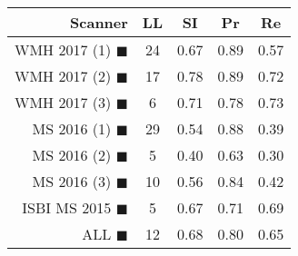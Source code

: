\begin{tabular}{rcccc}
\toprule
Scanner & LL & SI & Pr & Re \\
\midrule
WMH 2017 (1) {\color[rgb]{ 1.00 0.00 0.00}$\blacksquare$} & 24 & 0.67 & 0.89 & 0.57 \\
WMH 2017 (2) {\color[rgb]{ 1.00 0.50 0.00}$\blacksquare$} & 17 & 0.78 & 0.89 & 0.72 \\
WMH 2017 (3) {\color[rgb]{ 1.00 0.80 0.00}$\blacksquare$} & 6 & 0.71 & 0.78 & 0.73 \\
MS  2016 (1) {\color[rgb]{ 0.20 0.80 0.00}$\blacksquare$} & 29 & 0.54 & 0.88 & 0.39 \\
MS  2016 (2) {\color[rgb]{ 0.00 0.40 1.00}$\blacksquare$} & 5 & 0.40 & 0.63 & 0.30 \\
MS  2016 (3) {\color[rgb]{ 0.60 0.00 1.00}$\blacksquare$} & 10 & 0.56 & 0.84 & 0.42 \\
ISBI MS 2015 {\color[rgb]{ 1.00 0.00 1.00}$\blacksquare$} & 5 & 0.67 & 0.71 & 0.69 \\
\midrule
ALL {\color[rgb]{ 1.00 1.00 1.00}$\blacksquare$} & 12 & 0.68 & 0.80 & 0.65 \\
\bottomrule
\end{tabular}
